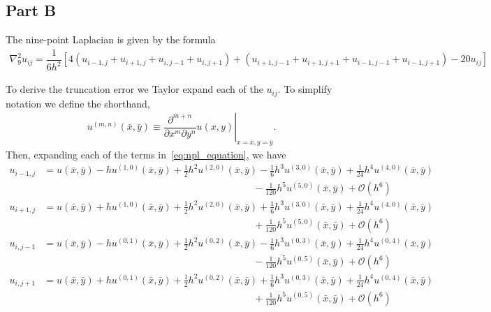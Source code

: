 \documentclass[12pt]{article}
\newcommand{\xbar}{\bar{x}}
\newcommand{\ybar}{\bar{y}}
\newcommand{\bO}{\mathcal{O}}
\begin{document}
\subsection*{Part B}

The nine-point Laplacian is given by the formula
\begin{align}
	\nabla^{2}_{9}u_{ij} = \dfrac{1}{6h^{2}}\left[
	4(u_{i-1,j}+u_{i+1,j}+u_{i,j-1}+u_{i,j+1})
	+ (u_{i+1,j-1}+u_{i+1,j+1}+u_{i-1,j-1}+u_{i-1,j+1})
	- 20u_{ij}
	\right]\label{eq:npl_equation}
\end{align}

To derive the truncation error we Taylor expand each of the $u_{ij}$. To simplify notation we define the shorthand,
\begin{align}
	u^{(m,n)}(\xbar,\ybar)\equiv \left.\dfrac{\partial^{m+n}}{\partial x^{m}\partial y^{n}}u(x,y)\right|_{x=\xbar,y=\ybar}.
\end{align}
Then, expanding each of the terms in~\eqref{eq:npl_equation}, we have
\begin{subequations}
	\begin{align}
		u_{i-1,j} &= u(\xbar,\ybar)-h u^{(1,0)}(\xbar,\ybar)+\frac{1}{2} h^2 u^{(2,0)}(\xbar,\ybar)-\frac{1}{6} h^3 u^{(3,0)}(\xbar,\ybar)+\frac{1}{24}	h^4 u^{(4,0)}(\xbar,\ybar)\nonumber\\
		&\hspace{9cm}-\frac{1}{120} h^5u^{(5,0)}(\xbar,\ybar)+\bO\left(h^6\right)\\	
		u_{i+1,j} &= u(\xbar,\ybar)+h u^{(1,0)}(\xbar,\ybar)+\frac{1}{2} h^2 u^{(2,0)}(\xbar,\ybar)+\frac{1}{6} h^3 u^{(3,0)}(\xbar,\ybar)+\frac{1}{24}
		h^4 u^{(4,0)}(\xbar,\ybar)\nonumber\\
		&\hspace{9cm}+\frac{1}{120} h^5u^{(5,0)}(\xbar,\ybar)+\bO\left(h^6\right)\\
		u_{i,j-1} &= u(\xbar,\ybar)-h u^{(0,1)}(\xbar,\ybar)+\frac{1}{2} h^2 u^{(0,2)}(\xbar,\ybar)-\frac{1}{6} h^3 u^{(0,3)}(\xbar,\ybar)+\frac{1}{24}
		h^4 u^{(0,4)}(\xbar,\ybar)\nonumber\\
		&\hspace{9cm}-\frac{1}{120} h^5u^{(0,5)}(\xbar,\ybar)+\bO\left(h^6\right)\\
		u_{i,j+1} &= u(\xbar,\ybar)+h u^{(0,1)}(\xbar,\ybar)+\frac{1}{2} h^2 u^{(0,2)}(\xbar,\ybar)+\frac{1}{6} h^3 u^{(0,3)}(\xbar,\ybar)+\frac{1}{24}
		h^4 u^{(0,4)}(\xbar,\ybar)\nonumber\\
		&\hspace{9cm}+\frac{1}{120} h^5u^{(0,5)}(\xbar,\ybar)+\bO\left(h^6\right)
	\end{align}
\end{subequations}
\end{document}

